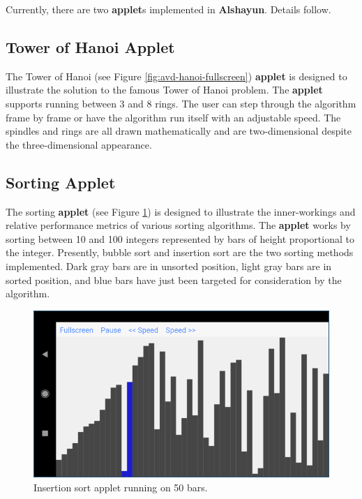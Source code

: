 \documentclass[12pt]{report}
\begin{document}
Currently, there are two \textbf{applet}s implemented in \textbf{Alshayun}.
Details follow.

        \subsection{Tower of Hanoi Applet}
        
The Tower of Hanoi (see Figure \ref{fig:avd-hanoi-fullscreen}) \textbf{applet}
is designed to illustrate the solution to the famous Tower of Hanoi problem. The
\textbf{applet} supports running between 3 and 8 rings. The user can step
through the algorithm frame by frame or have the algorithm run itself with an
adjustable speed. The spindles and rings are all drawn mathematically and are
two-dimensional despite the three-dimensional appearance.

        \subsection{Sorting Applet}

The sorting \textbf{applet} (see Figure \ref{fig:avd-sort-fullscreen}) is
designed to illustrate the inner-workings and relative performance metrics of
various sorting algorithms. The \textbf{applet} works by sorting between 10 and
100 integers represented by bars of height proportional to the integer.
Presently, bubble sort and insertion sort are the two sorting methods
implemented. Dark gray bars are in unsorted position, light gray bars are in
sorted position, and blue bars have just been targeted for consideration by the
algorithm.

\begin{figure}
    \centering
    \includegraphics[scale=0.5]{images/avd-sort-fullscreen.png}
    \caption{Insertion sort applet running on 50 bars.}
    \label{fig:avd-sort-fullscreen}
\end{figure}
\end{document}
